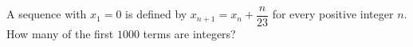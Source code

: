 A sequence with $x_1=0$ is defined by $x_{n+1}=x_n+\dfrac{n}{23}$ for every positive integer $n$. How many of the first $1000$ terms are integers?
